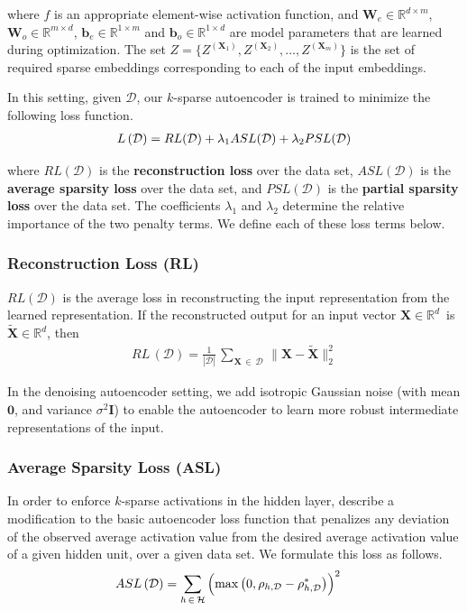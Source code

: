 \documentclass[letterpaper]{article} %
\begin{document}
\noindent where $f$ is an appropriate element-wise activation function, and $\mathbf{W}_e \in \mathbb{R}^{d \times m}$, $\mathbf{W}_o \in \mathbb{R}^{m \times d}$, $\mathbf{b}_e \in \mathbb{R}^{1 \times m}$ and $\mathbf{b}_o \in \mathbb{R}^{1 \times d}$ are model parameters that are learned during optimization. The set $Z = \{Z^{(\mathbf{X}_1)}, Z^{(\mathbf{X}_2)}, \dots, Z^{(\mathbf{X}_m)}\}$ is the set of required sparse embeddings corresponding to each of the input embeddings.

In this setting, given $\mathcal{D}$, our $k$-sparse autoencoder is trained to minimize the following loss function.
\begin{align*}
  \boldmath{L\,(\mathcal{D}) = RL(\mathcal{D}) + \lambda_1 ASL(\mathcal{D}) + \lambda_2 PSL(\mathcal{D})}
\end{align*}

\noindent where $RL(\mathcal{D})$ is the \textbf{reconstruction loss} over the data set, $ASL(\mathcal{D})$ is the \textbf{average sparsity loss} over the data set, and $PSL(\mathcal{D})$ is the \textbf{partial sparsity loss} over the data set. The coefficients $\lambda_1$ and $\lambda_2$ determine the relative importance of the two penalty terms. We define each of these loss terms below.

\subsubsection{Reconstruction Loss (RL)}
$RL(\mathcal{D})$ is the average loss in reconstructing the input representation from the learned representation. If the reconstructed output for an input vector $\mathbf{X} \in \mathbb{R}^{d}$\, is \,$\widetilde{\mathbf{X}} \in \mathbb{R}^d$, then
    \begin{align*}
      RL\,(\mathcal{D}) = \frac{1}{|\mathcal{D}|} \,\sum_{\mathbf{X} \,\in \,\mathcal{D}} \,\Big\lVert\mathbf{X}-\widetilde{\mathbf{X}}\Big\rVert_{2}^{2}
    \end{align*}

  In the denoising autoencoder setting, we add isotropic Gaussian noise (with mean $\mathbf{0}$, and variance $\sigma^{2}\mathbf{I}$) to enable the autoencoder to learn more robust intermediate representations of the input.

\subsubsection{Average Sparsity Loss (ASL)}
In order to enforce $k$-sparse activations in the hidden layer, \cite{ng2011sparse} describe a modification to the basic autoencoder loss function that penalizes any deviation of the observed average activation value from the desired average activation value of a given hidden unit, over a given data set. We formulate this loss as follows.
    \begin{align*}
      ASL\,(\mathcal{D}) &= \sum_{h \,\in \,\mathcal{H}} \,\Bigl(\max\,\bigl(0, \rho_{h,\mathcal{D}} - \rho^*_{h,\mathcal{D}}\bigr)\Bigr)^2
    \end{align*}
\end{document}
